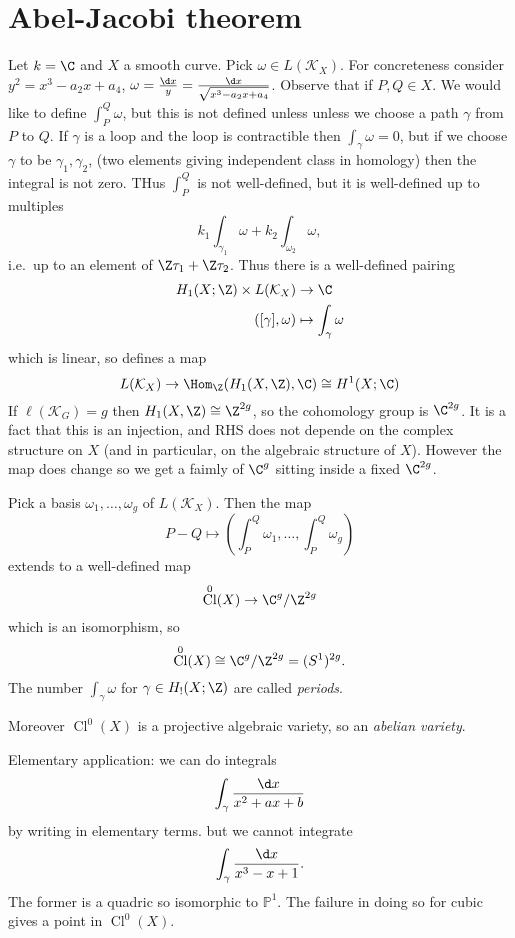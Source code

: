 \documentclass[a4paper]{article}
\DeclareMathOperator{\Cl}{Cl}
\renewcommand*{\P}{\mathbb{P}}
\begin{document}
\section{Abel-Jacobi theorem}

Let \(k = \C\) and \(X\) a smooth curve. Pick \(\omega \in L(\mathcal K_X)\). For concreteness consider \(y^2 = x^3 - a_2 x + a_4\), \(\omega = \frac{\d x}{y} = \frac{\d x}{\sqrt{x^3 - a_2 x + a_4}}\). Observe that if \(P, Q \in X\). We would like to define \(\int_P^Q \omega\), but this is not defined unless unless we choose a path \(\gamma\) from \(P\) to \(Q\). If \(\gamma\) is a loop and the loop is contractible then \(\int_\gamma \omega = 0\), but if we choose \(\gamma\) to be \(\gamma_1, \gamma_2\), (two elements giving independent class in homology) then the integral is not zero. THus \(\int_P^Q\) is not well-defined, but it is well-defined up to multiples
\[
  k_1 \int_{\gamma_1} \omega + k_2 \int_{\omega_2} \omega,
\]
i.e.\ up to an element of \(\Z \tau_1 + \Z \tau_2\). Thus there is a well-defined pairing
\begin{align*}
  H_1(X; \Z) \times L(\mathcal K_X) &\to \C \\
  ([\gamma], \omega) &\mapsto \int_\gamma \omega
\end{align*}
which is linear, so defines a map
\[
  L(\mathcal K_X) \to \Hom_\Z(H_1(X, \Z), \C) \cong H^1(X; \C)
\]
If \(\ell(\mathcal K_G) = g\) then \(H_1(X, \Z) \cong \Z^{2g}\), so the cohomology group is \(\C^{2g}\). It is a fact that this is an injection, and RHS does not depende on the complex structure on \(X\) (and in particular, on the algebraic structure of \(X\)). However the map does change so we get a faimly of \(\C^g\) sitting inside a fixed \(\C^{2g}\).

\begin{theorem}
  Pick a basis \(\omega_1, \dots, \omega_g\) of \(L(\mathcal K_X)\). Then the map
  \[
    P - Q \mapsto (\int_P^Q \omega_1, \dots, \int_P^Q \omega_g)
  \]
  extends to a well-defined map
  \[
    \Cl^0(X) \to \C^{g}/\Z^{2g}
  \]
  which is an isomorphism, so
  \[
    \Cl^0(X) \cong \C^g/\Z^{2g} = (S^1)^{2g}.
  \]
  The number \(\int_\gamma \omega\) for \(\gamma \in H_!(X; \Z)\) are called \emph{periods}.

  Moreover \(\Cl^0(X)\) is a projective algebraic variety, so an \emph{abelian variety}.
\end{theorem}

Elementary application: we can do integrals
\[
  \int_\gamma \frac{\d x}{x^2 + ax + b}
\]
by writing in elementary terms. but we cannot integrate
\[
  \int_\gamma \frac{\d x}{x^3 - x + 1}.
\]
The former is a quadric so isomorphic to \(\P^1\). The failure in doing so for cubic gives a point in \(\Cl^0(X)\).
\end{document}
